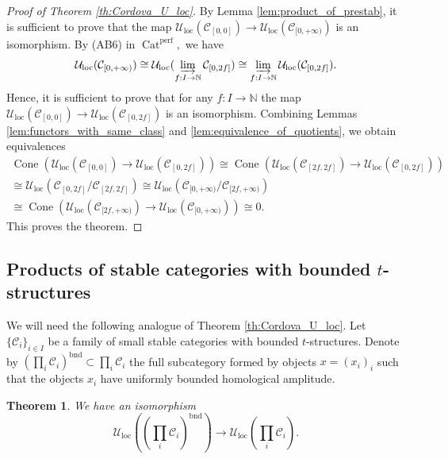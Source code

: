 \documentclass[11pt,leqno]{amsart}
\newtheorem{theo}{Theorem}[section]
\numberwithin{equation}{section}
\def\N{\mathbb{N}}
\newcommand{\indlim}[1][]{\mathop{\varinjlim}\limits_{#1}}
\newcommand{\prodd}[1][]{\mathop{\prod}\limits_{#1}}
\newcommand{\Cat}{\operatorname{Cat}}
\newcommand{\Cone}{\operatorname{Cone}}
\newcommand{\loc}{\operatorname{loc}}
\newcommand{\bnd}{\operatorname{bnd}}
\newcommand{\cC}{{\mathcal C}}
\newcommand{\cU}{{\mathcal U}}
\newcommand{\perf}{\operatorname{perf}}
\begin{document}
\begin{proof}[Proof of Theorem \ref{th:Cordova_U_loc}] By Lemma \ref{lem:product_of_prestab}, it is sufficient to prove that the map $\cU_{\loc}(\cC_{[0,0]})\to \cU_{\loc}(\cC_{[0,+\infty)})$ is an isomorphism. By (AB6) in $\Cat^{\perf},$ we have
$$\cU_{\loc}(\cC_{[0,+\infty)})\cong \cU_{\loc}(\indlim[f:I\to\N]\cC_{[0,2f]})\cong \indlim[f:I\to\N] \cU_{\loc}(\cC_{[0,2f]}).$$
Hence, it is sufficient to prove that for any $f:I\to\N$ the map $\cU_{\loc}(\cC_{[0,0]})\to \cU_{\loc}(\cC_{[0,2f]})$ is an isomorphism. Combining Lemmas \ref{lem:functors_with_same_class} and \ref{lem:equivalence_of_quotients}, we obtain equivalences
\begin{multline*}\Cone(\cU_{\loc}(\cC_{[0,0]})\to \cU_{\loc}(\cC_{[0,2f]}))\cong
 \Cone(\cU_{\loc}(\cC_{[2f,2f]})\to \cU_{\loc}(\cC_{[0,2f]}))\\ \cong \cU_{\loc}(\cC_{[0,2f]}/\cC_{[2f,2f]})\cong \cU_{\loc}(\cC_{[0,+\infty)}/\cC_{[2f,+\infty)})\\ \cong
  \Cone(\cU_{\loc}(\cC_{[2f,+\infty)})\to \cU_{\loc}(\cC_{[0,+\infty)}))\cong 0.\end{multline*}
  This proves the theorem.\end{proof}
  
\subsection{Products of stable categories with bounded $t$-structures}
\label{ssec:products_bounded_t_structures}

We will need the following analogue of Theorem \ref{th:Cordova_U_loc}. Let $\{\cC_i\}_{i\in I}$ be a family of small stable categories with bounded $t$-structures. Denote by $(\prodd[i]\cC_i)^{\bnd}\subset \prodd[i]\cC_i$ the full subcategory formed by objects $x=(x_i)_i$ such that the objects $x_i$ have uniformly bounded homological amplitude. 

\begin{theo}\label{th:U_loc_products_bounded_t-structures} We have an isomorphism $$\cU_{\loc}((\prodd[i]\cC_i)^{\bnd})\to \cU_{\loc}(\prodd[i]\cC_i).$$\end{theo}
\end{document}
